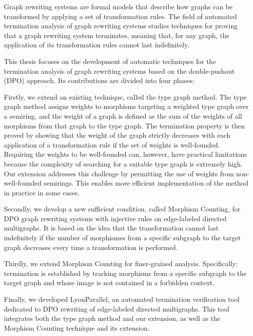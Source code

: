 Graph rewriting systems are formal models that describe how graphs can be transformed by applying a set of transformation rules. The field of automated termination analysis of graph rewriting systems studies techniques for proving that a graph rewriting system terminates, meaning that, for any graph, the application of its transformation rules cannot last indefinitely.

This thesis focuses on the development of automatic techniques for the termination analysis of graph rewriting systems based on the double-pushout (DPO) approach. Its contributions are divided into four phases:

Firstly, we extend an existing technique, called the type graph method. The type graph method assigns weights to morphisms targeting a weighted type graph over a semiring, and the weight of a graph is defined as the sum of the weights of all morphisms from that graph to the type graph. The termination property is then proved by showing that the weight of the graph strictly decreases with each application of a transformation rule if the set of weights is well-founded.
Requiring the weights to be well-founded can, however, have practical limitations because the complexity of searching for a suitable type graph is extremely high.
Our extension addresses this challenge by permitting the use of weights from non-well-founded semirings.
This enables more efficient implementation of the method in practice in some cases.

Secondly, we develop a new sufficient condition, called Morphism Counting, for DPO graph rewriting systems with injective rules on edge-labeled directed multigraphs. It is based on the idea that the transformation cannot last indefinitely if the number of morphismes from a specific subgraph to the target graph decreases every time a transformation is performed.

Thirdly, we extend Morphism Counting for finer-grained analysis. Specifically: termination is established by tracking morphisms from a specific subgraph to the target graph and whose image is not contained in a forbidden context.

Finally, we developed LyonParallel, an automated termination verification tool dedicated to DPO rewriting of edge-labeled directed multigraphs. This tool integrates both the type graph method and our extension, as well as the Morphism Counting technique and its extension.